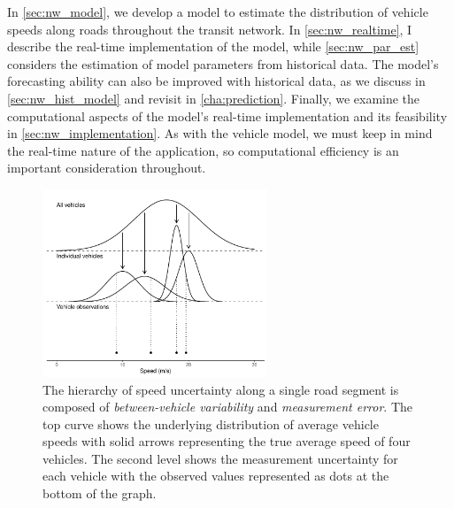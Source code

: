 In \cref{sec:nw_model}, we develop a model to estimate the distribution of vehicle speeds along roads throughout the transit network. In \cref{sec:nw_realtime}, I describe the real-time implementation of the model, while \cref{sec:nw_par_est} considers the estimation of model parameters from historical data. The model's forecasting ability can also be improved with historical data, as we discuss in \cref{sec:nw_hist_model} and revisit in \cref{cha:prediction}. Finally, we examine the computational aspects of the model's real-time implementation and its feasibility in \cref{sec:nw_implementation}. As with the vehicle model, we must keep in mind the real-time nature of the application, so computational efficiency is an important consideration throughout.


\begin{knitrout}\small
{}\color{fgcolor}\begin{figure}

{\centering \includegraphics[width=0.6\textwidth]{figure/nw_model_hierarchy-1} 

}

\caption[The hierarchy of speed uncertainty along a single road segment]{The hierarchy of speed uncertainty along a single road segment is composed of \emph{between-vehicle variability} and \emph{measurement error}. The top curve shows the underlying distribution of average vehicle speeds with solid arrows representing the true average speed of four vehicles. The second level shows the measurement uncertainty for each vehicle with the observed values represented as dots at the bottom of the graph.}\label{fig:nw_model_hierarchy}
\end{figure}


\end{knitrout}






